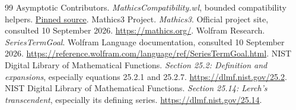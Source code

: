 \documentclass[11pt,letterpaper]{article}
\newcommand{\src}[2]{\href{https://github.com/VladimirReshetnikov/Asymptotic/blob/8cee870994f506b501bae3ea6bd4a3a7edb895c1/#1}{#2}}
\begin{document}
\begin{thebibliography}{99}
 Asymptotic Contributors. \emph{MathicsCompatibility.wl}, bounded compatibility helpers. \src{src/Kernel/MathicsCompatibility.wl}{Pinned source}.
 Mathics3 Project. \emph{Mathics3}. Official project site, consulted 10 September 2026. \url{https://mathics.org/}.
 Wolfram Research. \emph{SeriesTermGoal}. Wolfram Language documentation, consulted 10 September 2026. \url{https://reference.wolfram.com/language/ref/SeriesTermGoal.html}.
 NIST Digital Library of Mathematical Functions. \emph{Section 25.2: Definition and expansions}, especially equations 25.2.1 and 25.2.7. \url{https://dlmf.nist.gov/25.2}.
 NIST Digital Library of Mathematical Functions. \emph{Section 25.14: Lerch's transcendent}, especially its defining series. \url{https://dlmf.nist.gov/25.14}.
\end{thebibliography}
\end{document}
